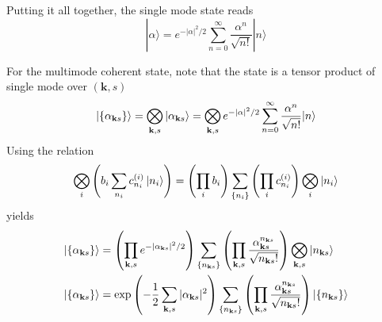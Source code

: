 \documentclass[../../../main.tex]{subfiles}
\begin{document}
Putting it all together, the single mode state reads
\begin{equation*}
  |\alpha\rangle = e^{-|\alpha|^2/2} \sum_{n=0}^{\infty} \frac{\alpha^n}{\sqrt{n!}} |n\rangle
\end{equation*}

For the multimode coherent state, note that the state is a tensor product of single mode over $(\mathbf{k},s)$
\begin{equation*}
  \ket{\left\{ \alpha_{\mathbf{k }s} \right\} } = \bigotimes_{\mathbf{k},s} \ket{\alpha_{\mathbf{k }s}}=
  \bigotimes_{\mathbf{k },s} e^{-|\alpha|^2/2} \sum_{n=0}^{\infty} \frac{\alpha^n}{\sqrt{n!}} |n\rangle
\end{equation*}
Using the relation
\begin{equation*}
  \bigotimes_i \left(b_i \sum_{n_i } c_{n_i }^{(i )}\ket{n_i}  \right)
  =
  \left( \prod_i b_i \right) \sum_{\left\{ n_i  \right\} }\left( \prod_i  c_{n_i} ^{(i)}\right)  \bigotimes_i \ket{n_i}
\end{equation*}
yields
\begin{align*}
  \ket{\left\{ \alpha_{\mathbf{k }s} \right\} }
   & =
  \left( \prod_{\mathbf{k},s} e^{-|\alpha_{\mathbf{k }s}|^2/2} \right) \sum_{\{n_{\mathbf{k }s}\}} \left( \prod_{\mathbf{k},s} \frac{\alpha_{\mathbf{k }s}^{n_{\mathbf{k }s}}}{\sqrt{n_{\mathbf{k }s}!}} \right) \bigotimes_{\mathbf{k },s}|n_{\mathbf{k }s}\rangle \\
  | \{ \alpha_{\mathbf{k }s} \} \rangle
   & =
  \exp\left(-\frac{1}{2} \sum_{\mathbf{k},s} |\alpha_{\mathbf{k }s}|^2\right) \sum_{\{ n_{\mathbf{k }s} \}} \left( \prod_{\mathbf{k},s} \frac{\alpha_{\mathbf{k }s}^{n_{\mathbf{k }s}}}{\sqrt{n_{\mathbf{k }s}!}} \right) \ket{\{ n_{\mathbf{k }s} \}}
\end{align*}
\end{document}
